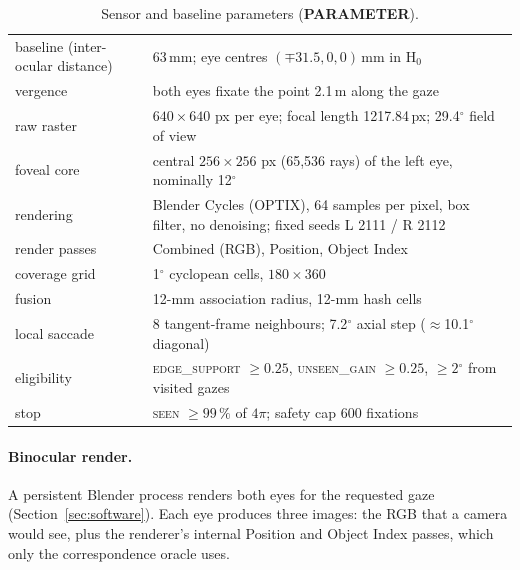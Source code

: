 \documentclass[11pt,a4paper]{article}
\newcommand{\truth}[1]{{\sffamily\footnotesize\textbf{#1}}}
\newcommand{\Hz}{\ensuremath{\mathrm{H}_0}}
\newcommand{\pct}[1]{#1\,\%}
\newcommand{\degr}{\ensuremath{^\circ}}
\begin{document}
\begin{table}[h]
\centering\small
\caption{Sensor and baseline parameters (\truth{PARAMETER}).}
\label{tab:params}
\begin{tabularx}{\linewidth}{@{}l X@{}}
\toprule
baseline (inter-ocular distance) & 63\,mm; eye centres $(\mp31.5, 0, 0)$\,mm in \Hz{} \\
vergence & both eyes fixate the point 2.1\,m along the gaze \\
raw raster & $640\times640$ px per eye; focal length 1217.84\,px; 29.4\degr{} field of view \\
foveal core & central $256\times256$ px (65{,}536 rays) of the left eye, nominally 12\degr{} \\
rendering & Blender Cycles (OPTIX), 64 samples per pixel, box filter, no denoising; fixed seeds L 2111 / R 2112 \\
render passes & Combined (RGB), Position, Object Index \\
coverage grid & 1\degr{} cyclopean cells, $180\times360$ \\
fusion & 12-mm association radius, 12-mm hash cells \\
local saccade & 8 tangent-frame neighbours; 7.2\degr{} axial step ($\approx$10.1\degr{} diagonal) \\
eligibility & \textsc{edge\_support} $\ge 0.25$, \textsc{unseen\_gain} $\ge 0.25$, $\ge 2\degr$ from visited gazes \\
stop & \textsc{seen} $\ge \pct{99}$ of $4\pi$; safety cap 600 fixations \\
\bottomrule
\end{tabularx}
\end{table}

\paragraph{Binocular render.} A persistent Blender process renders both eyes for the requested gaze
(Section~\ref{sec:software}). Each eye produces three images: the RGB that a camera would see, plus the renderer's
internal Position and Object Index passes, which only the correspondence oracle uses.
\end{document}
